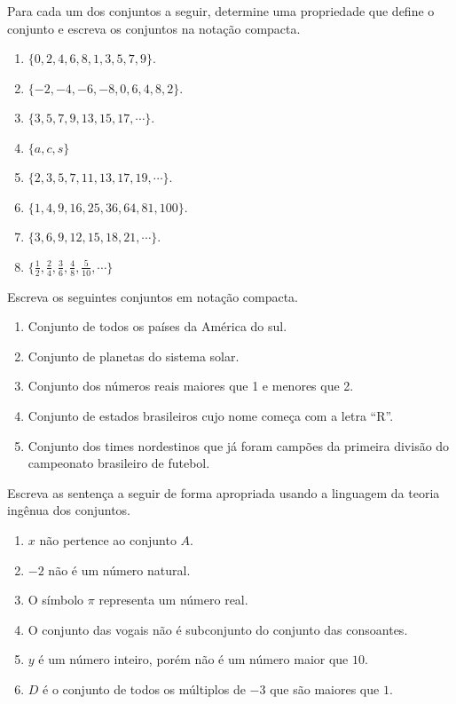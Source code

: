 \begin{problemset}
	\item Para cada um dos conjuntos a seguir, determine uma propriedade que define o conjunto e escreva os conjuntos na notação compacta.
	\begin{enumerate}
		\item $\{0,2,4,6,8,1,3,5,7,9\}$.
		\item $\{-2, -4, -6, -8, 0, 6, 4, 8, 2\}$.
		\item $\{3, 5, 7, 9, 13, 15, 17, \cdots\}$.
		\item $\{a, c, s\}$
		\item $\{2, 3, 5, 7, 11, 13, 17, 19, \cdots\}$.
		\item $\{1, 4, 9, 16, 25, 36, 64, 81, 100\}$.
		\item $\{3, 6, 9, 12, 15, 18, 21, \cdots\}$.
		\item $\{\frac{1}{2}, \frac{2}{4}, \frac{3}{6}, \frac{4}{8}, \frac{5}{10}, \cdots\}$
	\end{enumerate}
	\item Escreva os seguintes conjuntos em notação compacta.
	\begin{enumerate}
		\item Conjunto de todos os países da América do sul.
		\item Conjunto de planetas do sistema solar.
		\item Conjunto dos números reais maiores que 1 e menores que 2.
		\item Conjunto de estados brasileiros cujo nome começa com a letra ``R''.
		\item Conjunto dos times nordestinos que já foram campões da primeira divisão do campeonato brasileiro de futebol.
	\end{enumerate}
	\item Escreva as sentença a seguir de forma apropriada usando a linguagem da teoria ingênua dos conjuntos.
	\begin{enumerate}
		\item $x$ não pertence ao conjunto $A$.
		\item $-2$ não é um número natural.
		\item O símbolo $\pi$ representa um número real.
		\item O conjunto das vogais não é subconjunto do conjunto das consoantes. 
		\item $y$ é um número inteiro, porém não é um número maior que $10$.
		\item $D$ é o conjunto de todos os múltiplos de $-3$ que são maiores que $1$.

\end{enumerate}
\end{problemset}
